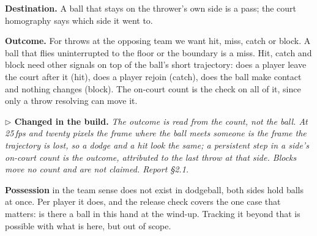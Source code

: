 \documentclass[10pt,a4paper]{article}
\newcommand{\changed}[1]{%
  \par\smallskip\noindent
  {\color{accent!88!black}\small\textbf{$\triangleright$ Changed in the build.} \textit{#1}}\par\smallskip}
\begin{document}
\textbf{Destination.} A ball that stays on the thrower's own side is a pass; the court
homography says which side it went to.

\textbf{Outcome.} For throws at the opposing team we want hit, miss, catch or block. A ball
that flies uninterrupted to the floor or the boundary is a miss. Hit, catch and block need
other signals on top of the ball's short trajectory: does a player leave the court after it (hit), does a player rejoin
(catch), does the ball make contact and nothing changes (block). The on-court count is the
check on all of it, since only a throw resolving can move it.

\changed{The outcome is read from the count, not the ball. At 25\,fps and twenty pixels the
frame where the ball meets someone is the frame the trajectory is lost, so a dodge and a hit
look the same; a persistent step in a side's on-court count is the outcome, attributed to the
last throw at that side. Blocks move no count and are not claimed. Report \S2.1.}

\textbf{Possession} in the team sense does not exist in dodgeball, both sides hold balls at
once. Per player it does, and the release check covers the one case that matters: is there a
ball in this hand at the wind-up. Tracking it beyond that is possible with what is here, but
out of scope.
\end{document}
